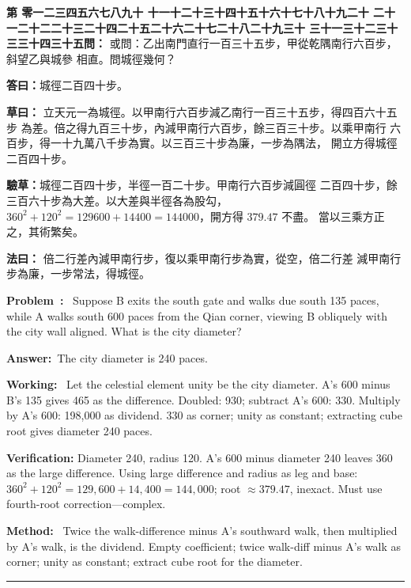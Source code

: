 \documentclass[9pt,a4paper]{article}
\newcounter{probnum}
\newcounter{overallnum}
\newcommand{\chnum}[1]{%
  \ifcase#1 零\or 一\or 二\or 三\or 四\or 五\or 六\or 七\or 八\or 九\or 十\or
    十一\or 十二\or 十三\or 十四\or 十五\or 十六\or 十七\or 十八\or 十九\or 二十\or
    二十一\or 二十二\or 二十三\or 二十四\or 二十五\or 二十六\or 二十七\or 二十八\or 二十九\or 三十\or
    三十一\or 三十二\or 三十三\or 三十四\or 三十五\fi}
\newcommand{\problem}[1]{\stepcounter{probnum}\stepcounter{overallnum}\par\noindent\textbf{\color{volcolor}第\chnum{\value{probnum}}問：}#1\par\vspace{0.15cm}}
\newcommand{\answer}[1]{\par\noindent\textbf{答曰：}#1\par\vspace{0.15cm}}
\newcommand{\working}[1]{\par\noindent\textbf{草曰：}#1\par\vspace{0.15cm}}
\newcommand{\method}[1]{\par\noindent\textbf{法曰：}#1\par\vspace{0.25cm}}
\newcommand{\eproblem}[1]{\par\noindent\textbf{\color{volcolor}Problem~\theoverallnum:}~#1\par\vspace{0.15cm}}
\newcommand{\eanswer}[1]{\par\noindent\textbf{Answer:}~#1\par\vspace{0.15cm}}
\newcommand{\eworking}[1]{\par\noindent\textbf{Working:}~#1\par\vspace{0.15cm}}
\newcommand{\emethod}[1]{\par\noindent\textbf{Method:}~#1\par\vspace{0.25cm}}
\begin{document}
\noindent\begin{minipage}[t]{0.48\textwidth}
\problem{
或問：乙出南門直行一百三十五步，甲從乾隅南行六百步，斜望乙與城參
相直。問城徑幾何？
}

\answer{城徑二百四十步。}

\working{
立天元一為城徑。以甲南行六百步減乙南行一百三十五步，得四百六十五步
為差。倍之得九百三十步，內減甲南行六百步，餘三百三十步。以乘甲南行
六百步，得一十九萬八千步為實。以三百三十步為廉，一步為隅法，
開立方得城徑二百四十步。

\textbf{驗草：}城徑二百四十步，半徑一百二十步。甲南行六百步減圓徑
二百四十步，餘三百六十步為大差。以大差與半徑各為股勾，
$360^2 + 120^2 = 129600 + 14400 = 144000$，開方得 $379.47$ 不盡。
當以三乘方正之，其術繁矣。
}

\method{
倍二行差內減甲南行步，復以乘甲南行步為實，從空，倍二行差
減甲南行步為廉，一步常法，得城徑。
}
\end{minipage}%
\hfill%
\begin{minipage}[t]{0.50\textwidth}
\eproblem{
Suppose B exits the south gate and walks due south 135 paces, while A walks
south 600 paces from the Qian corner, viewing B obliquely with the city wall
aligned. What is the city diameter?
}

\eanswer{The city diameter is 240 paces.}

\eworking{
Let the celestial element unity be the city diameter. A's 600 minus B's 135
gives 465 as the difference. Doubled: 930; subtract A's 600: 330. Multiply
by A's 600: 198,000 as dividend. 330 as corner; unity as constant;
extracting cube root gives diameter 240 paces.

\textbf{Verification:} Diameter 240, radius 120. A's 600 minus diameter 240
leaves 360 as the large difference. Using large difference and radius as
leg and base: $360^2 + 120^2 = 129{,}600 + 14{,}400 = 144{,}000$;
root $\approx 379.47$, inexact. Must use fourth-root correction---complex.
}

\emethod{
Twice the walk-difference minus A's southward walk, then multiplied by A's
walk, is the dividend. Empty coefficient; twice walk-diff minus A's walk as
corner; unity as constant; extract cube root for the diameter.
}
\end{minipage}
\vspace{0.15cm}

\vspace{0.15cm}
\noindent\rule{\textwidth}{0.2pt}
\vspace{0.15cm}
\end{document}
